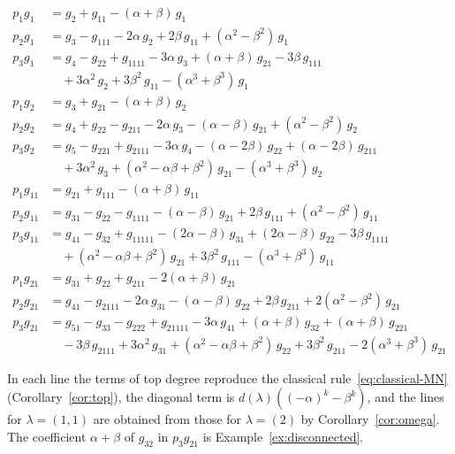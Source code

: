 \documentclass[11pt]{amsart}
\numberwithin{equation}{section}
\theoremstyle{definition}
\theoremstyle{remark}
\begin{document}
{\small
\begin{align*}
p_1g_{1} &= g_{2}+g_{11}-(\alpha+\beta)\,g_{1}\\[2pt]
p_2g_{1} &= g_{3}-g_{111}-2\alpha\,g_{2}+2\beta\,g_{11}+(\alpha^{2}-\beta^{2})\,g_{1}\\[2pt]
p_3g_{1} &= g_{4}-g_{22}+g_{1111}-3\alpha\,g_{3}+(\alpha+\beta)\,g_{21}-3\beta\,g_{111}\\
 &\quad+3\alpha^{2}\,g_{2}+3\beta^{2}\,g_{11}-(\alpha^{3}+\beta^{3})\,g_{1}\\[2pt]
p_1g_{2} &= g_{3}+g_{21}-(\alpha+\beta)\,g_{2}\\[2pt]
p_2g_{2} &= g_{4}+g_{22}-g_{211}-2\alpha\,g_{3}-(\alpha-\beta)\,g_{21}+(\alpha^{2}-\beta^{2})\,g_{2}\\[2pt]
p_3g_{2} &= g_{5}-g_{221}+g_{2111}-3\alpha\,g_{4}-(\alpha-2\beta)\,g_{22}+(\alpha-2\beta)\,g_{211}\\
 &\quad+3\alpha^{2}\,g_{3}+(\alpha^{2}-\alpha\beta+\beta^{2})\,g_{21}-(\alpha^{3}+\beta^{3})\,g_{2}\\[2pt]
p_1g_{11} &= g_{21}+g_{111}-(\alpha+\beta)\,g_{11}\\[2pt]
p_2g_{11} &= g_{31}-g_{22}-g_{1111}-(\alpha-\beta)\,g_{21}+2\beta\,g_{111}+(\alpha^{2}-\beta^{2})\,g_{11}\\[2pt]
p_3g_{11} &= g_{41}-g_{32}+g_{11111}-(2\alpha-\beta)\,g_{31}+(2\alpha-\beta)\,g_{22}-3\beta\,g_{1111}\\
 &\quad+(\alpha^{2}-\alpha\beta+\beta^{2})\,g_{21}+3\beta^{2}\,g_{111}-(\alpha^{3}+\beta^{3})\,g_{11}\\[2pt]
p_1g_{21} &= g_{31}+g_{22}+g_{211}-2(\alpha+\beta)\,g_{21}\\[2pt]
p_2g_{21} &= g_{41}-g_{2111}-2\alpha\,g_{31}-(\alpha-\beta)\,g_{22}+2\beta\,g_{211}+2(\alpha^{2}-\beta^{2})\,g_{21}\\[2pt]
p_3g_{21} &= g_{51}-g_{33}-g_{222}+g_{21111}-3\alpha\,g_{41}+(\alpha+\beta)\,g_{32}+(\alpha+\beta)\,g_{221}\\
 &\quad-3\beta\,g_{2111}+3\alpha^{2}\,g_{31}+(\alpha^{2}-\alpha\beta+\beta^{2})\,g_{22}+3\beta^{2}\,g_{211}
 -2(\alpha^{3}+\beta^{3})\,g_{21}
\end{align*}
}

In each line the terms of top degree reproduce the classical
rule~\eqref{eq:classical-MN} (Corollary~\ref{cor:top}), the diagonal term is
$d(\lambda)((-\alpha)^k-\beta^k)$, and the lines for $\lambda=(1,1)$ are obtained
from those for $\lambda=(2)$ by Corollary~\ref{cor:omega}. The coefficient
$\alpha+\beta$ of $g_{32}$ in $p_3g_{21}$ is Example~\ref{ex:disconnected}.
\end{document}
